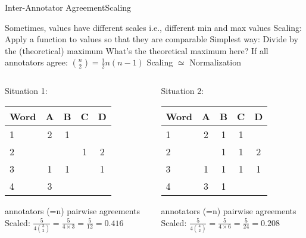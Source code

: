 \documentclass[aspectratio=169]{beamer}
\begin{document}
\begin{frame}{Inter-Annotator Agreement}{Scaling}
\begin{outline}
\1 Sometimes, values have different scales
\2 i.e., different min and max values
\1 Scaling: Apply a function to values so that they are comparable
\2 Simplest way: Divide by the (theoretical) maximum
\pause
\1 What's the theoretical maximum here?
\2 If all annotators agree: ${n\choose 2} = \frac{1}{2}n(n-1)$
\pause
\1 Scaling $\simeq$ Normalization
\end{outline}
\end{frame}

\begin{frame}
\begin{columns}[T]
\begin{column}{.45\paperwidth}
Situation 1:

\begin{tabular}{lcccc}
\toprule
Word & A & B & C & D \\
\midrule
1 & 2 & 1 &   &   \\
2 &   &   & 1 & 2 \\
3 & 1 & 1 &   & 1 \\
4 & 3 &   &   &   \\
\bottomrule
\end{tabular}
\begin{outline}
 annotators (=n)
 pairwise agreements
\1 Scaled: $\frac{5}{4{3\choose 2}} = \frac{5}{4\times 3} = \frac{5}{12} = 0.416$
\end{outline}
\end{column}

\begin{column}{.45\paperwidth}
Situation 2:

\begin{tabular}{lcccc}
\toprule
Word & A & B & C & D \\
\midrule
1 & 2 & 1 & 1 &   \\
2 &   & 1 & 1 & 2 \\
3 & 1 & 1 & 1 & 1 \\
4 & 3 & 1 &   &   \\
\bottomrule
\end{tabular}
\begin{outline}
 annotators (=n)
 pairwise agreements
\1 Scaled: $\frac{5}{4{4\choose 2}} = \frac{5}{4 \times 6} = \frac{5}{24} = 0.208$
\end{outline}
\end{column}
\end{columns}
\end{frame}
\end{document}
